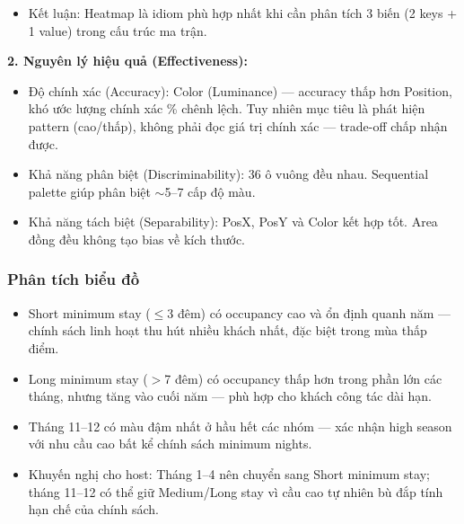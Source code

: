 \begin{itemize}
\begin{itemize}
        \item Ưu tiên 3 -- Độ sáng màu sắc (Color Luminance / Sequential): Color Luminance mã hóa Occupancy Rate (Quantitative) thông qua thang màu tuần tự (nhạt $\rightarrow$ đậm). Theo Mackinlay, Color Luminance không phải kênh tối ưu nhất cho dữ liệu định lượng về độ chính xác tuyệt đối (kém hơn Position hay Length), nhưng trong heatmap --- nơi cả PosX và PosY đã được dùng để mã hóa hai biến phân loại/thứ tự --- đây là kênh duy nhất khả dụng để mã hóa giá trị định lượng thứ ba trong không gian hai chiều. Color Luminance phù hợp để phát hiện pattern (nhận biết ô đậm/nhạt) và so sánh tương đối giữa các ô, phục vụ đúng mục tiêu discover của heatmap. Kích thước ô đồng đều (square) loại bỏ nhiễu từ kênh Area, giúp người xem chỉ tập trung vào màu sắc.
    \end{itemize}
    \item Kết luận: Heatmap là idiom phù hợp nhất khi cần phân tích 3 biến (2 keys + 1 value) trong cấu trúc ma trận.
\end{itemize}

\textbf{2. Nguyên lý hiệu quả (Effectiveness):}

\begin{itemize}
    \item Độ chính xác (Accuracy): Color (Luminance) --- accuracy thấp hơn Position, khó ước lượng chính xác \% chênh lệch. Tuy nhiên mục tiêu là phát hiện pattern (cao/thấp), không phải đọc giá trị chính xác --- trade-off chấp nhận được.
    \item Khả năng phân biệt (Discriminability): 36 ô vuông đều nhau. Sequential palette giúp phân biệt $\sim$5--7 cấp độ màu.
    \item Khả năng tách biệt (Separability): PosX, PosY và Color kết hợp tốt. Area đồng đều không tạo bias về kích thước.
\end{itemize}

\subsubsection{Phân tích biểu đồ}

\begin{itemize}
    \item Short minimum stay ($\leq$3 đêm) có occupancy cao và ổn định quanh năm --- chính sách linh hoạt thu hút nhiều khách nhất, đặc biệt trong mùa thấp điểm.
    \item Long minimum stay ($>$7 đêm) có occupancy thấp hơn trong phần lớn các tháng, nhưng tăng vào cuối năm --- phù hợp cho khách công tác dài hạn.
    \item Tháng 11--12 có màu đậm nhất ở hầu hết các nhóm --- xác nhận high season với nhu cầu cao bất kể chính sách minimum nights.
    \item Khuyến nghị cho host: Tháng 1--4 nên chuyển sang Short minimum stay; tháng 11--12 có thể giữ Medium/Long stay vì cầu cao tự nhiên bù đắp tính hạn chế của chính sách.
\end{itemize}
